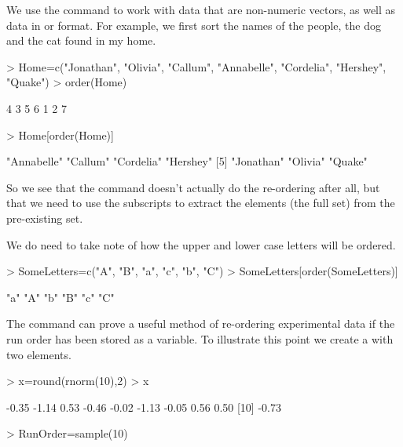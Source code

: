 We use the  command to work with data that are non-numeric vectors, as well as data in  or  format. For example, we first sort the names of the people, the dog and the cat found in my home.
\begin{Schunk}
\begin{Sinput}
> Home=c("Jonathan", "Olivia", "Callum", "Annabelle", "Cordelia", "Hershey", "Quake")
> order(Home)
\end{Sinput}
\begin{Soutput}
[1] 4 3 5 6 1 2 7
\end{Soutput}
\begin{Sinput}
> Home[order(Home)]
\end{Sinput}
\begin{Soutput}
[1] "Annabelle" "Callum"    "Cordelia"  "Hershey"  
[5] "Jonathan"  "Olivia"    "Quake"    
\end{Soutput}
\end{Schunk}

So we see that the  command doesn't actually do the re-ordering after all, but that we need to use the subscripts to extract the elements (the full set) from the pre-existing set.

We do need to take note of how the upper and lower case letters will be ordered.
\begin{Schunk}
\begin{Sinput}
> SomeLetters=c("A", "B", "a", "c", "b", "C")
> SomeLetters[order(SomeLetters)]
\end{Sinput}
\begin{Soutput}
[1] "a" "A" "b" "B" "c" "C"
\end{Soutput}
\end{Schunk}

The  command can prove a useful method of re-ordering experimental data if the run order has been stored as a variable. To illustrate this point we create a  with two elements.
\begin{Schunk}
\begin{Sinput}
> x=round(rnorm(10),2)
> x
\end{Sinput}
\begin{Soutput}
 [1] -0.35 -1.14  0.53 -0.46 -0.02 -1.13 -0.05  0.56  0.50
[10] -0.73
\end{Soutput}
\begin{Sinput}
> RunOrder=sample(10)
\end{Sinput}
\end{Schunk}

